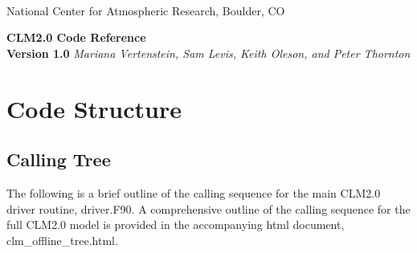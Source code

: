 \documentclass[]{article}
\begin{document}

\begin{titlepage}

\begin{latexonly}
 \\
\noindent National Center for Atmospheric Research, Boulder, CO \\
\vspace{2in}
\end{latexonly}

\begin{center}
{\Large\bf CLM2.0 Code Reference} \\
{\bf Version 1.0}
\medskip
{\it Mariana Vertenstein, Sam Levis, Keith Oleson, and Peter Thornton}
\end{center}

\end{titlepage}

\tableofcontents

\newpage
\section{Code Structure}

\subsection {Calling Tree}

The following is a brief outline of the calling sequence for the main
CLM2.0 driver routine, driver.F90.  A comprehensive outline of the
calling sequence for the full CLM2.0 model is provided in the
accompanying html document,
{clm_offline_tree.html}.
\end{document}

